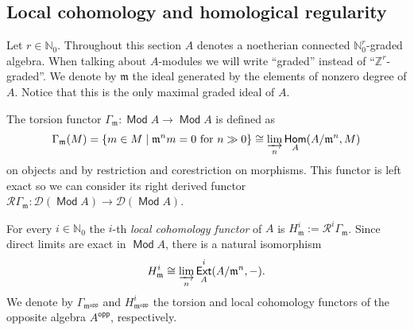 \documentclass[11pt,fleqn]{article}
\theoremstyle{plain}
\theoremstyle{remark}
\theoremstyle{definition}
\newcommand\NN{\mathbb N}
\newcommand\ZZ{\mathbb Z}
\renewcommand\to{\longrightarrow}
\newcommand\D{\mathcal D}
\newcommand\GG{\Gamma}
\newcommand\R{\mathcal R}
\newcommand\m{\mathfrak m}
\newcommand\opp{\mathsf{opp}}
\DeclareMathOperator\Mod{\mathsf{Mod}}
\DeclareMathOperator\Hom{\mathsf{Hom}}
\DeclareMathOperator\Ext{\mathsf{Ext}}
\begin{document}
\subsection{Local cohomology and homological regularity}
Let $r \in \NN_0$. Throughout this section $A$ denotes a noetherian connected 
$\NN_0^r$-graded algebra. When talking about $A$-modules we will write ``graded'' instead
of ``$\ZZ^r$-graded''.
We denote by $\m$ the ideal generated by the elements of nonzero degree of $A$. Notice
that this is the only maximal graded ideal of $A$.

The torsion functor $\GG_\m: \Mod A \to \Mod A$ is defined as 
\begin{align*}
\GG_\m(M) = \{m \in M \mid \m^n m = 0 \mbox{ for } n \gg 0\} \cong \varinjlim_n
\Hom_A(A/\m^n,M)
\end{align*}
on objects and by restriction and corestriction on morphisms. This functor
is left exact so we can consider its right derived functor $\R \GG_\m : \D(\Mod A) \to
\D(\Mod A)$.

For every $i \in \NN_0$ the $i$-th \emph{local cohomology functor} of $A$ is $H_\m^i :=
\R^i \GG_\m$. Since direct limits are exact in $\Mod A$, there is a natural isomorphism
\begin{align*}
H_\m^i \cong \varinjlim_n \Ext_A^i(A/\m^n,-).
\end{align*}
We denote by $\GG_{\m^\opp}$ and $H_{\m^\opp}^i$ the torsion and local cohomology
functors of the opposite algebra $A^\opp$, respectively.
\end{document}
